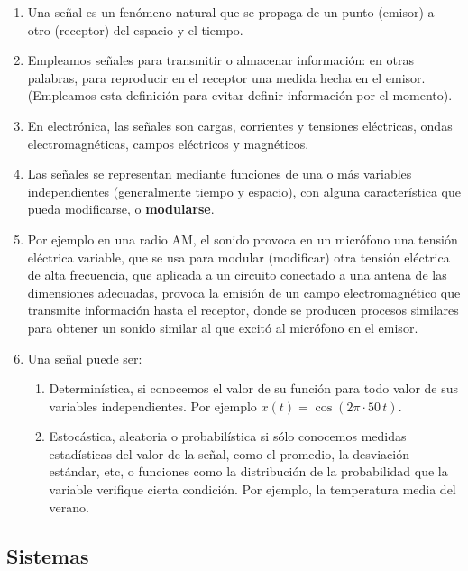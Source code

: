 \begin{enumerate}
	
	\item Una señal es un fenómeno natural que se propaga de un punto (emisor) a otro (receptor) del espacio y el tiempo.
	\item Empleamos señales para transmitir o almacenar información: en otras palabras, para reproducir en el receptor una medida hecha en el emisor. (Empleamos esta definición para evitar definir información por el momento).
	\item En electrónica, las señales son cargas, corrientes y tensiones eléctricas, ondas electromagnéticas, campos eléctricos y magnéticos.
	\item Las señales se representan mediante funciones de una o más variables independientes (generalmente tiempo y espacio), con alguna característica que pueda modificarse, o \textbf{modularse}.
	\item Por ejemplo en una radio AM, el sonido provoca en un micrófono una tensión eléctrica variable, que se usa para modular (modificar) otra tensión eléctrica de alta frecuencia, que aplicada a un circuito conectado a una antena de las dimensiones adecuadas, provoca la emisión de un campo electromagnético que transmite información hasta el receptor, donde se producen procesos similares para obtener un sonido similar al que excitó al micrófono en el emisor.
	
	
	\item Una señal puede ser:
	\begin{enumerate}
		\item Determinística, si conocemos el valor de su función para todo valor de sus variables independientes. Por ejemplo $x(t) = \cos(2 \pi \cdot 50 \, t)$.
		\item Estocástica, aleatoria o probabilística si sólo conocemos medidas estadísticas del valor de la señal, como el promedio, la desviación estándar, etc, o funciones como la distribución de la probabilidad que la variable verifique cierta condición. Por ejemplo, la temperatura media del verano.
	\end{enumerate}
	
\end{enumerate}

\subsection{Sistemas}

